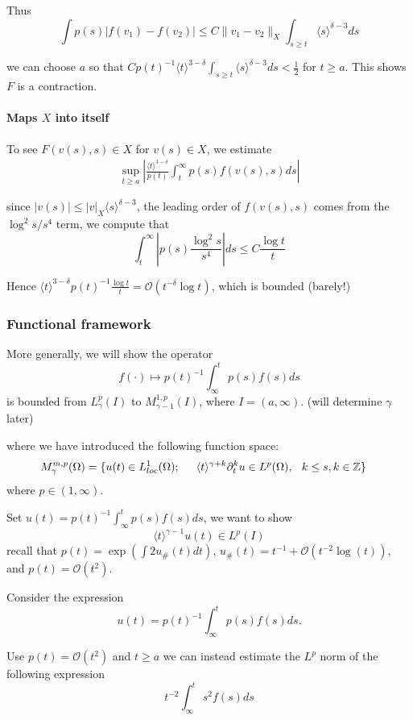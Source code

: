 \documentclass[letterpaper,11pt]{article}
\newcommand{\rmO}{\mathcal{O}}
\numberwithin{equation}{section}
\theoremstyle{plain}
\begin{document}
Thus 
\[
\int p(s)|f(v_1)-f(v_2)| \le C\|v_1-v_2\|_X \int_{s\ge t} \langle s\rangle ^{\delta-3}ds 
\]

we can choose $a$ so that $Cp(t)^{-1}\langle t \rangle^{3-\delta}\int_{s\ge t} \langle s\rangle ^{\delta-3}ds < \frac{1}{2}$ for $t\ge a$. This shows $F$ is a contraction.

\paragraph{Maps $X$ into itself}
To see $F(v(s),s) \in X$ for $v(s) \in X$, we estimate 
\begin{align*}
\sup_{t \ge a} \left|\frac{\langle t \rangle^{3-\delta} }{p(t)} \int_t^\infty p(s)f(v(s),s) ds \right|
\end{align*}

since $|v(s)| \le |v|_X \langle s\rangle^{\delta-3}$, the leading order of $f(v(s),s)$ comes from the $\log^2 s/s^4$ term, we compute that 
\[
\int_t^\infty |p(s) \frac{\log^2 s}{s^4}| ds \le C \frac{\log t}{t}
 \]

Hence $\langle t \rangle^{3-\delta}p(t)^{-1} \frac{\log t}{t} = \rmO (t^{-\delta}\log t)$, which is bounded (barely!)


\subsubsection{Functional framework}
More generally, we will show the operator
\[
f(\cdot) \mapsto p(t)^{-1}\int_{\infty}^t p(s)f(s)ds
\] 
is bounded from $L^p_{\gamma}(I)$ to $M^{1,p}_{\gamma-1}(I)$, where $I = (a,\infty)$. (will determine $\gamma$ later)


where we have introduced the following function space:
\begin{align*}
M^{m,p}_{\gamma}(\Omega)=\{ &u(t) \in L^1_{loc}(\Omega); \hspace{0.2in} \langle t \rangle^{\gamma+ k} \partial^k_t u \in L^p(\Omega), \hspace{0.1in} k \le s, k \in \mathbb{Z}
\}
\end{align*}
where $p\in (1,\infty)$.

Set $u(t) = p(t)^{-1}\int_\infty^t p(s)f(s)ds$, we want to show
\[
\langle t \rangle^{\gamma-1}u(t) \in L^p(I)
\]
recall that $p(t) = \exp(\int 2u_\#(t)dt)$, $u_\#(t) = t^{-1}+\rmO(t^{-2}\log(t))$, and $p(t) = \rmO(t^2).$

Consider the expression
\[
u(t) = p(t)^{-1}\int_\infty^t p(s)f(s)ds.
\]

Use $p(t)=\rmO(t^2)$ and $t\ge a$ we can instead estimate the $L^p$ norm of the following expression
\[
t^{-2}\int_{\infty}^t s^2 f(s)ds
\]
\end{document}
